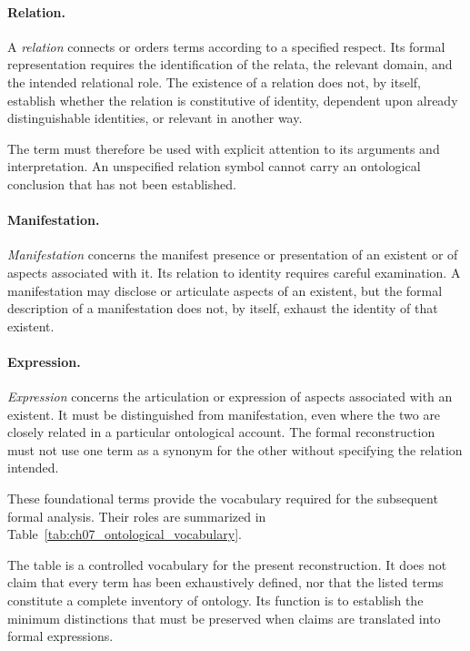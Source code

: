 \paragraph{Relation.}

A \emph{relation} connects or orders terms according
to a specified respect. Its formal representation
requires the identification of the relata, the
relevant domain, and the intended relational role.
The existence of a relation does not, by itself,
establish whether the relation is constitutive
of identity, dependent upon already distinguishable
identities, or relevant in another way.

The term must therefore be used with explicit
attention to its arguments and interpretation.
An unspecified relation symbol cannot carry an
ontological conclusion that has not been established.

\paragraph{Manifestation.}

\emph{Manifestation} concerns the manifest presence
or presentation of an existent or of aspects
associated with it. Its relation to identity
requires careful examination. A manifestation
may disclose or articulate aspects of an existent,
but the formal description of a manifestation
does not, by itself, exhaust the identity of
that existent.

\paragraph{Expression.}

\emph{Expression} concerns the articulation or
expression of aspects associated with an existent.
It must be distinguished from manifestation,
even where the two are closely related in a
particular ontological account. The formal
reconstruction must not use one term as a
synonym for the other without specifying the
relation intended.

These foundational terms provide the vocabulary
required for the subsequent formal analysis. Their
roles are summarized in Table~\ref{tab:ch07_ontological_vocabulary}.



The table is a controlled vocabulary for the present
reconstruction. It does not claim that every term
has been exhaustively defined, nor that the listed
terms constitute a complete inventory of ontology.
Its function is to establish the minimum distinctions
that must be preserved when claims are translated
into formal expressions.

